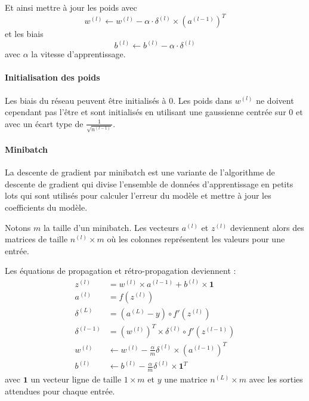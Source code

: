 \documentclass[11pt]{paper}
\begin{document}
Et ainsi mettre à jour les poids avec
$$w^{(l)} \leftarrow w^{(l)} - \alpha \cdot \delta^{(l)} \times (a^{(l-1)})^T$$
 et les biais 
 $$b^{(l)} \leftarrow b^{(l)} - \alpha \cdot \delta^{(l)}$$ avec $\alpha$ la vitesse d'apprentissage.

\paragraph{Initialisation des poids}

Les biais du réseau peuvent être initialisés à 0. Les poids dans $w^{(l)}$ ne doivent cependant pas l'être et sont initialisés en utilisant une gaussienne centrée sur 0 et avec un écart type de $\frac{1}{\sqrt{n^{(l-1)}}}$.


\paragraph{Minibatch}

La descente de gradient par minibatch est une variante de l'algorithme de descente de gradient qui divise l'ensemble de données d'apprentissage en petits lots qui sont utilisés pour calculer l'erreur du modèle et mettre à jour les coefficients du modèle.

Notons $m$ la taille d'un minibatch. Les vecteurs $a^{(l)}$ et $z^{(l)}$ deviennent alors des matrices de taille $n^{(l)} \times m$ où les colonnes représentent les valeurs pour une entrée.

Les équations de propagation et rétro-propagation deviennent :
\begin{align*}
z^{(l)} &= w^{(l)} \times a^{(l-1)} + b^{(l)} \times \mathbf{1}\\
a^{(l)} &= f \left (z^{(l)} \right)\\
\delta^{(L)} &= (a^{(L)} - y)  \circ f'(z^{(l)})\\
\delta^{(l-1)} &= (w^{(l)})^T \times \delta^{(l)} \circ f'(z^{(l-1)})\\
w^{(l)} &\leftarrow w^{(l)} - \frac{\alpha}{m} \delta^{(l)} \times (a^{(l-1)})^T\\
b^{(l)} &\leftarrow b^{(l)} - \frac{\alpha}{m} \delta^{(l)} \times \mathbf{1}^T
\end{align*}
avec $\mathbf{1}$ un vecteur ligne de taille $1 \times m$ et $y$ une matrice $n^{(L)} \times m$ avec les sorties attendues pour chaque entrée.
\end{document}
